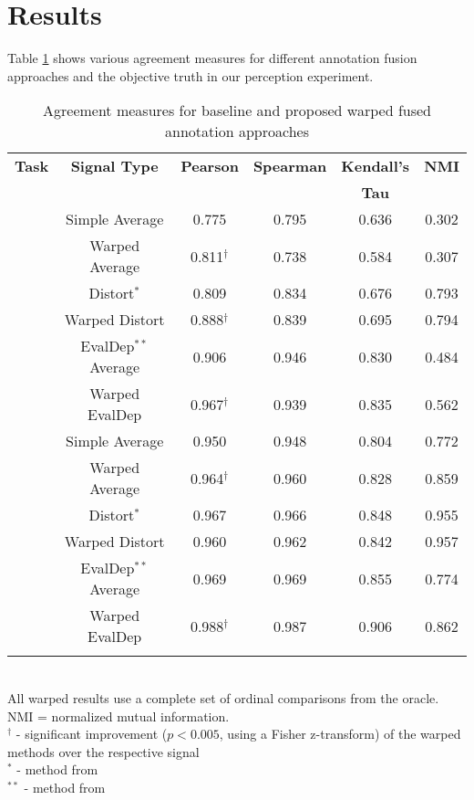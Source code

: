 \documentclass[times,twocolumn,final,authoryear]{elsarticle}
\begin{document}
\section{Results}
Table \ref{tab:results} shows various agreement measures for different annotation fusion approaches and the objective truth in our perception experiment.

\setlength\tabcolsep{1pt}
\setlength\extrarowheight{1pt}
\begin{table}[h!]
\caption{\label{tab:results} Agreement measures for baseline and proposed warped fused annotation approaches}
\centering
\begin{tabular}{ cccccc } 
 \Xhline{2\arrayrulewidth}
 \textbf{Task} & \textbf{Signal Type} & \textbf{Pearson} & \textbf{Spearman} & \textbf{Kendall's} & \textbf{NMI} \\
  & & & & \textbf{Tau} & \\
 \Xhline{2\arrayrulewidth}
 \multirow{6}{*}{\textbf{A}} & Simple Average & 0.775 & 0.795 & 0.636 & 0.302 \\ 
 & Warped Average & 0.811$^\dagger$ & 0.738 & 0.584 & 0.307 \\
 \cline{2-6}
 & Distort$^{*}$ & 0.809 & 0.834 & 0.676 & 0.793 \\
 & Warped Distort & 0.888$^\dagger$ & 0.839 & 0.695 & 0.794 \\
 \cline{2-6}
 & EvalDep$^{**}$ Average & 0.906 & 0.946 & 0.830 & 0.484 \\
 & Warped EvalDep & 0.967$^\dagger$ & 0.939 & 0.835 & 0.562 \\
 \Xhline{2\arrayrulewidth}
 \multirow{6}{*}{\textbf{B}} & Simple Average & 0.950 & 0.948 & 0.804 & 0.772 \\ 
 & Warped Average & 0.964$^\dagger$ & 0.960 & 0.828 & 0.859 \\
 \cline{2-6}
 & Distort$^{*}$  & 0.967 & 0.966 & 0.848 & 0.955 \\
 & Warped Distort  & 0.960 & 0.962 & 0.842 & 0.957 \\
 \cline{2-6}
 & EvalDep$^{**}$ Average  & 0.969 & 0.969 & 0.855 & 0.774 \\
 & Warped EvalDep  & 0.988$^\dagger$ & 0.987 & 0.906 & 0.862 \\
 \Xhline{2\arrayrulewidth}
\end{tabular}
\vspace*{4pt} \\
{\footnotesize All warped results use a complete set of ordinal comparisons from the oracle. NMI = normalized mutual information.  \\ $^\dagger$ - significant improvement ($p<0.005$, using a Fisher z-transform) of the warped methods over the respective signal \\ $^{*}$ - method from \cite{Gupta2016} \\ $^{**}$ - method from \cite{Mariooryad2015}}
\end{table}
\end{document}
